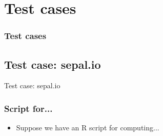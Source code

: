 \section{Test cases}

\begin{frame}
\frametitle{Test cases}
\end{frame}

\subsection{Test case: sepal.io}

\begin{frame}
	Test case: sepal.io
\end{frame}

\begin{frame}
	\frametitle{Script for...}
	\begin{itemize}
		\item Suppose we have an R script for computing...
	\end{itemize}
\end{frame}
